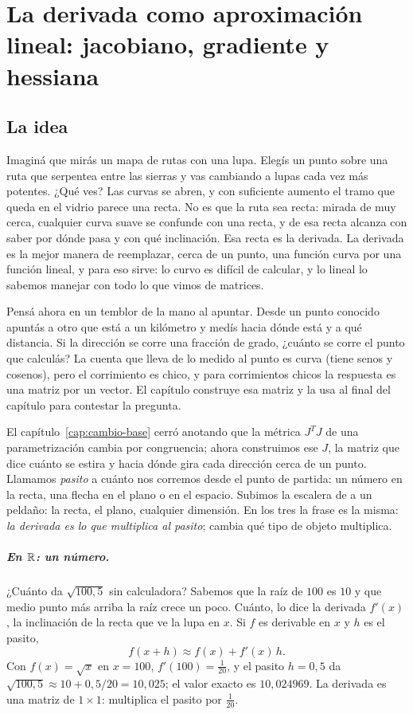 \chapter{La derivada como aproximación lineal: jacobiano, gradiente y hessiana}\label{cap:derivada}

\section{La idea}

Imaginá que mirás un mapa de rutas con una lupa. Elegís un punto sobre una ruta que serpentea
entre las sierras y vas cambiando a lupas cada vez más potentes. ¿Qué ves? Las curvas se abren,
y con suficiente aumento el tramo que queda en el vidrio parece una recta. No es que la ruta
sea recta: mirada de muy cerca, cualquier curva suave se confunde con una recta, y de esa recta
alcanza con saber por dónde pasa y con qué inclinación. Esa recta es la derivada. La derivada es
la mejor manera de reemplazar, cerca de un punto, una función curva por una función lineal, y
para eso sirve: lo curvo es difícil de calcular, y lo lineal lo sabemos manejar con todo lo que
vimos de matrices.

Pensá ahora en un temblor de la mano al apuntar. Desde un punto conocido apuntás a otro que
está a un kilómetro y medís hacia dónde está y a qué distancia. Si la dirección se corre una
fracción de grado, ¿cuánto se corre el punto que calculás? La cuenta que lleva de lo medido al
punto es curva (tiene senos y cosenos), pero el corrimiento es chico, y para corrimientos
chicos la respuesta es una matriz por un vector. El capítulo construye esa matriz y la usa al
final del capítulo para contestar la pregunta.

El capítulo~\ref{cap:cambio-base} cerró anotando que la métrica \(J^TJ\) de una
parametrización cambia por congruencia; ahora construimos ese \(J\), la matriz que dice
cuánto se estira y hacia dónde gira cada dirección cerca de un punto. Llamamos \emph{pasito} a
cuánto nos corremos desde el punto de partida: un número en la recta, una flecha en el plano o
en el espacio. Subimos la escalera de a un peldaño: la recta, el plano, cualquier dimensión. En
los tres la frase es la misma: \emph{la derivada es lo que multiplica al pasito}; cambia qué
tipo de objeto multiplica.

\paragraph{En \(\mathbb{R}\): un número.} ¿Cuánto da \(\sqrt{100{,}5}\) sin calculadora? Sabemos que la
raíz de \(100\) es \(10\) y que medio punto más arriba la raíz crece un poco. Cuánto, lo dice la
derivada \(f'(x)\), la inclinación de la recta que ve la lupa en \(x\). Si \(f\) es derivable en
\(x\) y \(h\) es el pasito,
\[
  f(x+h)\approx f(x)+f'(x)\,h .
\]
Con \(f(x)=\sqrt x\) en \(x=100\), \(f'(100)=\tfrac1{20}\), y el pasito \(h=0{,}5\) da
\(\sqrt{100{,}5}\approx10+0{,}5/20=10{,}025\); el valor exacto es \(10{,}024969\). La
derivada es una matriz de \(1\times1\): multiplica el pasito por \(\tfrac1{20}\).

